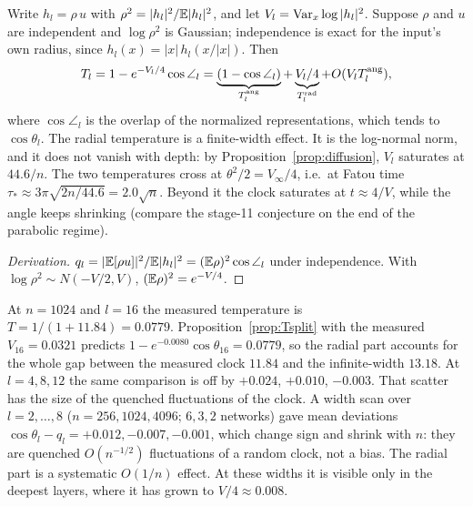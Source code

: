 \begin{proposition}\label{prop:Tsplit}
Write $h_l=\rho\,u$ with $\rho^2=|h_l|^2/\mathbb E|h_l|^2$, and let $V_l=\operatorname{Var}_x\log|h_l|^2$. Suppose $\rho$ and $u$ are independent and $\log\rho^2$
is Gaussian; independence is exact for the input's own radius, since $h_l(x)=|x|\,h_l(x/|x|)$. Then
\[
T_l=1-e^{-V_l/4}\cos\angle_l=\underbrace{(1-\cos\angle_l)}_{T^{\rm ang}_l}+\underbrace{V_l/4}_{T^{\rm rad}_l}+O(V_lT_l^{\rm ang}),
\]
where $\cos\angle_l$ is the overlap of the normalized representations, which tends to $\cos\theta_l$. The radial temperature is a
finite-width effect. It is the log-normal norm, and it does not vanish with depth: by Proposition~\ref{prop:diffusion}, $V_l$ saturates at
$44.6/n$. The two temperatures cross at $\theta^2/2=V_\infty/4$, i.e.\ at Fatou time $\tau_*\approx3\pi\sqrt{2n/44.6}=2.0\sqrt n$. Beyond
it the clock saturates at $t\approx4/V$, while the angle keeps shrinking (compare the stage-11 conjecture on the end of the parabolic
regime).
\end{proposition}
\begin{proof}[Derivation]
$q_l=|\mathbb E[\rho u]|^2/\mathbb E|h_l|^2=(\mathbb E\rho)^2\cos\angle_l$ under independence. With $\log\rho^2\sim N(-V/2,V)$, $(\mathbb E\rho)^2=e^{-V/4}$.
\end{proof}
At $n=1024$ and $l=16$ the measured temperature is $T=1/(1+11.84)=0.0779$. Proposition~\ref{prop:Tsplit} with the measured $V_{16}=0.0321$
predicts $1-e^{-0.0080}\cos\theta_{16}=0.0779$, so the radial part accounts for the whole gap between the measured clock $11.84$ and the
infinite-width $13.18$. At $l=4,8,12$ the same comparison is off by $+0.024$, $+0.010$, $-0.003$. That scatter has the size of the quenched
fluctuations of the clock. A width scan over $l=2,\dots,8$ ($n=256,1024,4096$; $6,3,2$ networks) gave mean deviations
$\cos\theta_l-q_l=+0.012,-0.007,-0.001$, which change sign and shrink with $n$: they are quenched $O(n^{-1/2})$ fluctuations of a random
clock, not a bias. The radial part is a systematic $O(1/n)$ effect. At these widths it is visible only in the deepest layers, where it
has grown to $V/4\approx0.008$.

